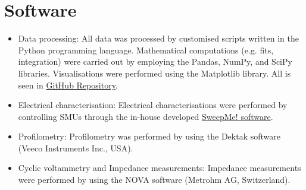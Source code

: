 \section{Software}
\begin{itemize}
\item Data processing: All data was processed by customised scripts written in the Python programming language. Mathematical computations (e.g. fits, integration) were carried out by employing the Pandas, NumPy, and SciPy libraries. Visualisations were performed using the Matplotlib library. All is seen in \href{https://github.com/marivelascoe25/Thesis.git}{GitHub Repository}.
\item Electrical characterisation: Electrical characterisations were performed by controlling SMUs through the in-house developed \href{https://sweep-me.net/}{SweepMe! software}. 
\item Profilometry: Profilometry was performed by using the Dektak software (Veeco Instruments Inc., USA).
\item Cyclic voltammetry and Impedance measurements: Impedance measurements were performed by using the NOVA software (Metrohm AG, Switzerland).
\end{itemize}


